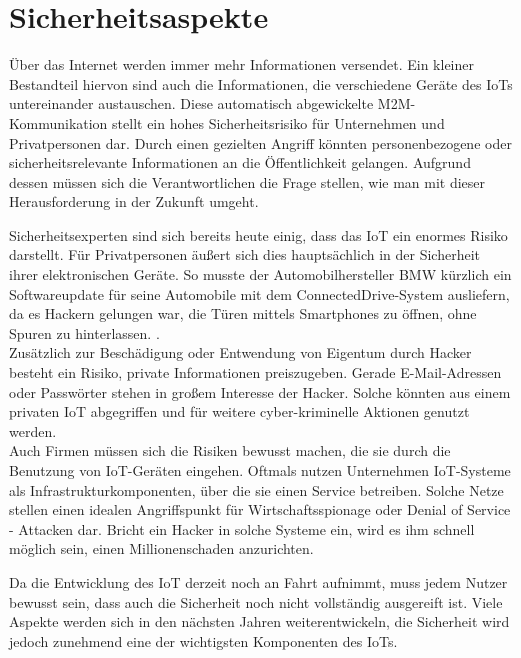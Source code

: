 \section{Sicherheitsaspekte}\label{s:Sicherheitsaspekte}

Über das Internet werden  immer mehr Informationen versendet. Ein kleiner Bestandteil hiervon sind auch die Informationen, die verschiedene Geräte des \ac{IoT}s untereinander austauschen.
Diese automatisch abgewickelte \ac{M2M}-Kommunikation stellt ein hohes Sicherheitsrisiko für Unternehmen und Privatpersonen dar. Durch einen gezielten Angriff könnten personenbezogene oder sicherheitsrelevante Informationen an die Öffentlichkeit gelangen. Aufgrund dessen müssen sich die Verantwortlichen die Frage stellen, wie man mit dieser Herausforderung in der Zukunft umgeht. 

Sicherheitsexperten sind sich bereits heute einig, dass das \ac{IoT} ein enormes Risiko darstellt\cite{ws:iotsec}. Für Privatpersonen äußert sich dies hauptsächlich in der Sicherheit ihrer elektronischen Geräte. So musste der Automobilhersteller BMW kürzlich ein Softwareupdate für seine Automobile mit dem ConnectedDrive-System ausliefern, da es Hackern gelungen war, die Türen mittels Smartphones zu öffnen, ohne Spuren zu hinterlassen. \cite{ws:zeitbmw}.\\

Zusätzlich zur Beschädigung oder Entwendung von Eigentum durch Hacker besteht ein Risiko, private Informationen preiszugeben. Gerade E-Mail-Adressen oder Passwörter stehen in großem Interesse der Hacker. Solche könnten aus einem privaten \ac{IoT} abgegriffen und für weitere cyber-kriminelle Aktionen genutzt werden. \\

Auch Firmen müssen sich die Risiken bewusst machen, die sie durch die Benutzung von \ac{IoT}-Geräten eingehen. Oftmals nutzen Unternehmen \ac{IoT}-Systeme als Infrastrukturkomponenten, über die sie einen Service betreiben. Solche Netze stellen einen idealen Angriffspunkt für Wirtschaftsspionage oder Denial of Service - Attacken dar. Bricht ein Hacker in solche Systeme ein, wird es ihm schnell möglich sein, einen Millionenschaden anzurichten.


Da die Entwicklung des \ac{IoT} derzeit noch an Fahrt aufnimmt, muss jedem Nutzer bewusst sein, dass auch die Sicherheit noch nicht vollständig ausgereift ist. Viele Aspekte werden sich in den nächsten Jahren weiterentwickeln, die Sicherheit wird jedoch zunehmend eine der wichtigsten Komponenten des \ac{IoT}s.\\


